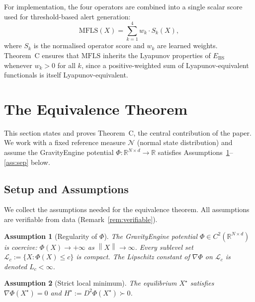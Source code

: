 \documentclass[11pt]{article}
\newtheorem{assumption}{Assumption}
\theoremstyle{definition}
\newcommand{\R}{\mathbb{R}}
\newcommand{\Xst}{X^{\star}}
\newcommand{\grad}{\nabla}
\newcommand{\Ebs}{E_{\mathrm{BS}}}
\newcommand{\norm}[1]{\left\|#1\right\|}
\begin{document}
For implementation, the four operators are combined into a single scalar score
used for threshold-based alert generation:
\begin{equation}\label{eq:mfls}
  \mathrm{MFLS}(X) = \sum_{k=1}^{4} w_k \cdot S_k(X),
\end{equation}
where $S_k$ is the normalised operator score and $w_k$ are learned weights.
Theorem~C ensures that $\mathrm{MFLS}$ inherits the Lyapunov properties of $\Ebs$
whenever $w_k > 0$ for all $k$, since a positive-weighted sum of Lyapunov-equivalent
functionals is itself Lyapunov-equivalent.

\section{The Equivalence Theorem}
\label{sec:equiv}

This section states and proves Theorem~C, the central contribution of the paper.
We work with a fixed reference measure $\mathcal{N}$ (normal state distribution)
and assume the GravityEngine potential $\Phi : \R^{N\times d}\to\R$ satisfies
Assumptions~\ref{ass:reg}--\ref{ass:sep} below.

\subsection{Setup and Assumptions}
\label{sec:equiv:setup}

We collect the assumptions needed for the equivalence theorem.  All assumptions
are verifiable from data (Remark~\ref{rem:verifiable}).

\begin{assumption}[Regularity of $\Phi$]
\label{ass:reg}
The GravityEngine potential $\Phi \in C^2(\R^{N\times d})$ is coercive:
$\Phi(X)\to+\infty$ as $\norm{X}\to\infty$.  Every sublevel set
$\mathcal{L}_c := \{X : \Phi(X)\le c\}$ is compact.
The Lipschitz constant of $\grad\Phi$ on $\mathcal{L}_c$ is denoted $L_c < \infty$.
\end{assumption}

\begin{assumption}[Strict local minimum]
\label{ass:equil}
The equilibrium $\Xst$ satisfies $\grad\Phi(\Xst)=0$ and
$H^\star := D^2\Phi(\Xst) \succ 0$.
\end{assumption}
\end{document}
